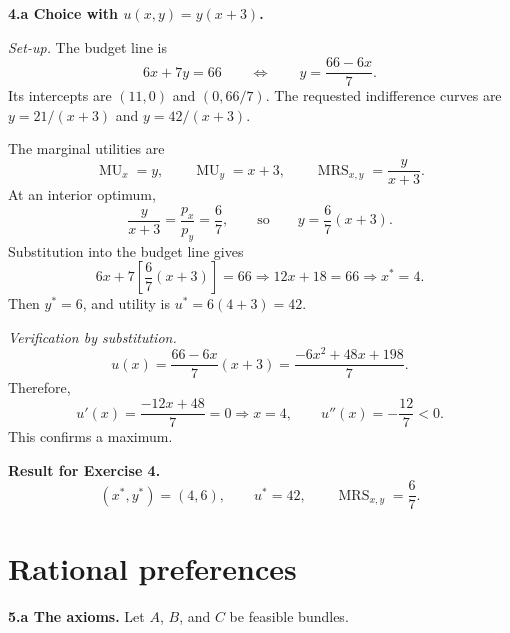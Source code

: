 \documentclass[11pt,a4paper]{article}
\newcommand{\MRS}{\operatorname{MRS}}
\newcommand{\MU}{\operatorname{MU}}
\begin{document}
\textbf{4.a Choice with \(u(x,y)=y(x+3)\).}

\textit{Set-up.} The budget line is
\[
  6x+7y=66
  \qquad\Longleftrightarrow\qquad
  y=\frac{66-6x}{7}.
\]
Its intercepts are \((11,0)\) and \((0,66/7)\). The requested indifference
curves are \(y=21/(x+3)\) and \(y=42/(x+3)\).

The marginal utilities are
\[
  \MU_x=y,
  \qquad
  \MU_y=x+3,
  \qquad
  \MRS_{x,y}=\frac{y}{x+3}.
\]
At an interior optimum,
\[
  \frac{y}{x+3}=\frac{p_x}{p_y}=\frac67,
  \qquad\text{so}\qquad
  y=\frac67(x+3).
\]
Substitution into the budget line gives
\[
  6x+7\left[\frac67(x+3)\right]=66
  \Longrightarrow
  12x+18=66
  \Longrightarrow
  x^*=4.
\]
Then \(y^*=6\), and utility is \(u^*=6(4+3)=42\).

\textit{Verification by substitution.}
\[
  u(x)=\frac{66-6x}{7}(x+3)
  =\frac{-6x^2+48x+198}{7}.
\]
Therefore,
\[
  u'(x)=\frac{-12x+48}{7}=0
  \Longrightarrow x=4,
  \qquad
  u''(x)=-\frac{12}{7}<0.
\]
This confirms a maximum.

\begin{solutionbox}
\textbf{Result for Exercise 4.}
\[
  \boxed{(x^*,y^*)=(4,6),\qquad u^*=42,\qquad
  \MRS_{x,y}=\frac67.}
\]
\end{solutionbox}

\section{Rational preferences}

\textbf{5.a The axioms.} Let \(A\), \(B\), and \(C\) be feasible bundles.
\end{document}
